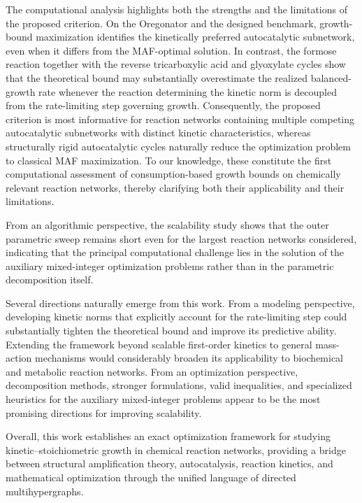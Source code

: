\documentclass[a4paper,11pt,reqno]{amsart}
\begin{document}
The computational analysis highlights both the strengths and the limitations of
the proposed criterion. On the Oregonator and the designed benchmark,
growth-bound maximization identifies the kinetically preferred
autocatalytic subnetwork, even when it differs from the MAF-optimal
solution. In contrast, the formose reaction together with the reverse
tricarboxylic acid and glyoxylate cycles show that the theoretical bound may
substantially overestimate the realized balanced-growth rate whenever the
reaction determining the kinetic norm is decoupled from the rate-limiting step
governing growth. Consequently, the proposed criterion is most informative for
reaction networks containing multiple competing autocatalytic subnetworks with
distinct kinetic characteristics, whereas structurally rigid autocatalytic
cycles naturally reduce the optimization problem to classical MAF
maximization. To our knowledge, these constitute the first computational
assessment of consumption-based growth bounds on chemically relevant reaction
networks, thereby clarifying both their applicability and their limitations.

From an algorithmic perspective, the scalability study shows that the outer
parametric sweep remains short even for the largest reaction networks
considered, indicating that the principal computational challenge lies in the
solution of the auxiliary mixed-integer optimization problems rather than in
the parametric decomposition itself.

Several directions naturally emerge from this work. From a modeling
perspective, developing kinetic norms that explicitly account for the
rate-limiting step could substantially tighten the theoretical bound and
improve its predictive ability. Extending the framework beyond scalable
first-order kinetics to general mass-action mechanisms would considerably
broaden its applicability to biochemical and metabolic reaction networks.
From an optimization perspective, decomposition methods, stronger
formulations, valid inequalities, and specialized heuristics for the
auxiliary mixed-integer problems appear to be the most promising directions
for improving scalability.

Overall, this work establishes an exact optimization framework for studying
kinetic--stoichiometric growth in chemical reaction networks, providing a
bridge between structural amplification theory, autocatalysis, reaction kinetics, and
mathematical optimization through the unified language of directed
multihypergraphs.
\end{document}
